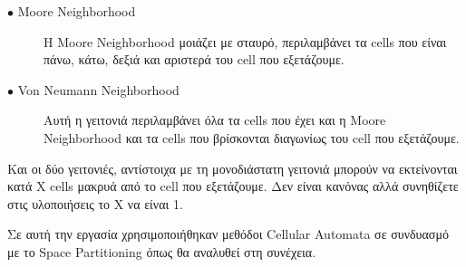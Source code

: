 \begin{description}
  \item[$\bullet$ Moore Neighborhood] Η Moore Neighborhood μοιάζει με σταυρό, περιλαμβάνει τα cells που είναι πάνω, κάτω, δεξιά και αριστερά του cell που εξετάζουμε. 
    \item[$\bullet$ Von Neumann Neighborhood] Αυτή η γειτονιά περιλαμβάνει όλα τα cells που έχει και η Moore Neighborhood και τα cells που βρίσκονται διαγωνίως του cell που εξετάζουμε.
\end{description}
Και οι δύο γειτονιές, αντίστοιχα με τη μονοδιάστατη γειτονιά μπορούν να εκτείνονται κατά X cells μακρυά από το cell που εξετάζουμε. Δεν είναι κανόνας αλλά συνηθίζετε στις υλοποιήσεις το X να είναι 1.
\par
Σε αυτή την εργασία χρησιμοποιήθηκαν μεθόδοι Cellular Automata σε συνδυασμό με το Space Partitioning όπως θα αναλυθεί στη συνέχεια.